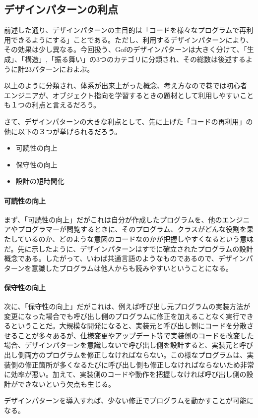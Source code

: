 \documentclass[dvipdfmx]{jsarticle}
\begin{document}
\subsection{デザインパターンの利点}
前述した通り、デザインパターンの主目的は「コードを様々なプログラムで再利用できるようにする」ことである。ただし、利用するデザインパターンにより、その効果は少し異なる。今回扱う、Gofのデザインパターンは大きく分けて、「生成」、「構造」,「振る舞い」の3つのカテゴリに分類され、その総数は後述するように計23パターンにおよぶ。\par
以上のように分類され、体系が出来上がった概念、考え方なので巷では初心者エンジニアが、オブジェクト指向を学習するときの題材として利用しやすいことも１つの利点と言えるだろう。\par
さて、デザインパターンの大きな利点として、先に上げた「コードの再利用」の他に以下の３つが挙げられるだろう。
\begin{itemize}
  \item 可読性の向上
  \item 保守性の向上
  \item 設計の短時間化
\end{itemize}
\paragraph{可読性の向上}まず、「可読性の向上」だがこれは自分が作成したプログラムを、他のエンジニアやプログラマーが閲覧するときに、そのプログラム、クラスがどんな役割を果たしているのか、どのような意図のコードなのかが把握しやすくなるという意味だ。先に示したように、デザインパターンはすでに確立されたプログラムの設計概念である。したがって、いわば共通言語のようなものであるので、デザインパターンを意識したプログラムは他人からも読みやすいということになる。\par
\paragraph{保守性の向上}次に、「保守性の向上」だがこれは、例えば呼び出し元プログラムの実装方法が変更になった場合でも呼び出し側のプログラムに修正を加えることなく実行できるということだ。大規模な開発になると、実装元と呼び出し側にコードを分散させることが多々あるが、仕様変更やアップデート等で実装側のコードを改変した場合、デザインパターンを意識しないで呼び出し側を設計すると、実装元と呼び出し側両方のプログラムを修正しなければならない。この様なプログラムは、実装側の修正箇所が多くなるたびに呼び出し側も修正しなければならないため非常に効率が悪い。加えて、実装側のコードや動作を把握しなければ呼び出し側の設計ができないという欠点も生じる。\par
デザインパターンを導入すれば、少ない修正でプログラムを動かすことが可能になる。
\end{document}
